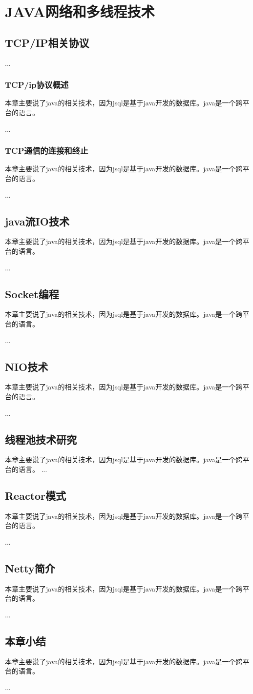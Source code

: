 
\chapter{JAVA网络和多线程技术}
\section{TCP/IP相关协议}
...
\subsection{TCP/ip协议概述}
本章主要说了java的相关技术，因为jsql是基于java开发的数据库。java是一个跨平台的语言。

...
\subsection{TCP通信的连接和终止}
本章主要说了java的相关技术，因为jsql是基于java开发的数据库。java是一个跨平台的语言。

...
\section{java流IO技术}
本章主要说了java的相关技术，因为jsql是基于java开发的数据库。java是一个跨平台的语言。

...
\section{Socket编程}
本章主要说了java的相关技术，因为jsql是基于java开发的数据库。java是一个跨平台的语言。

...
\section{NIO技术}
本章主要说了java的相关技术，因为jsql是基于java开发的数据库。java是一个跨平台的语言。

...
\section{线程池技术研究}
本章主要说了java的相关技术，因为jsql是基于java开发的数据库。java是一个跨平台的语言。
...
\section{Reactor模式}
本章主要说了java的相关技术，因为jsql是基于java开发的数据库。java是一个跨平台的语言。

...
\section{Netty简介}
本章主要说了java的相关技术，因为jsql是基于java开发的数据库。java是一个跨平台的语言。

...
\section{本章小结}
本章主要说了java的相关技术，因为jsql是基于java开发的数据库。java是一个跨平台的语言。

...